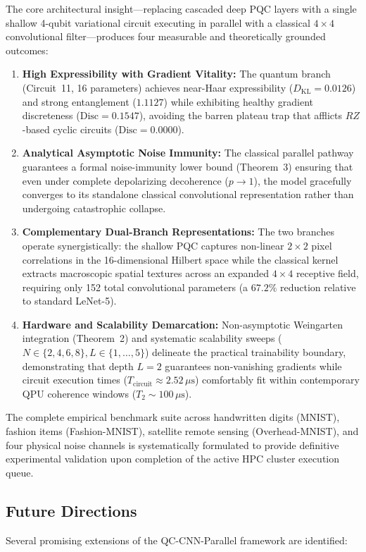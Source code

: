 \documentclass[journal]{IEEEtran}
\begin{document}
The core architectural insight---replacing cascaded deep PQC layers with a single shallow 4-qubit variational circuit executing in parallel with a classical $4 \times 4$ convolutional filter---produces four measurable and theoretically grounded outcomes:
\begin{enumerate}
    \item \textbf{High Expressibility with Gradient Vitality:} The quantum branch (Circuit~11, 16 parameters) achieves near-Haar expressibility ($D_{\mathrm{KL}} = 0.0126$) and strong entanglement ($1.1127$) while exhibiting healthy gradient discreteness ($\mathrm{Disc} = 0.1547$), avoiding the barren plateau trap that afflicts $RZ$-based cyclic circuits ($\mathrm{Disc} = 0.0000$).
    \item \textbf{Analytical Asymptotic Noise Immunity:} The classical parallel pathway guarantees a formal noise-immunity lower bound (Theorem~3) ensuring that even under complete depolarizing decoherence ($p \to 1$), the model gracefully converges to its standalone classical convolutional representation rather than undergoing catastrophic collapse.
    \item \textbf{Complementary Dual-Branch Representations:} The two branches operate synergistically: the shallow PQC captures non-linear $2 \times 2$ pixel correlations in the 16-dimensional Hilbert space while the classical kernel extracts macroscopic spatial textures across an expanded $4 \times 4$ receptive field, requiring only 152 total convolutional parameters (a $67.2\%$ reduction relative to standard LeNet-5).
    \item \textbf{Hardware and Scalability Demarcation:} Non-asymptotic Weingarten integration (Theorem~2) and systematic scalability sweeps ($N \in \{2,4,6,8\}, L \in \{1,\dots,5\}$) delineate the practical trainability boundary, demonstrating that depth $L = 2$ guarantees non-vanishing gradients while circuit execution times ($T_{\mathrm{circuit}} \approx 2.52\,\mu\mathrm{s}$) comfortably fit within contemporary QPU coherence windows ($T_2 \sim 100\,\mu\mathrm{s}$).
\end{enumerate}

The complete empirical benchmark suite across handwritten digits (MNIST), fashion items (Fashion-MNIST), satellite remote sensing (Overhead-MNIST), and four physical noise channels is systematically formulated to provide definitive experimental validation upon completion of the active HPC cluster execution queue.

\subsection{Future Directions}
Several promising extensions of the QC-CNN-Parallel framework are identified:
\end{document}
